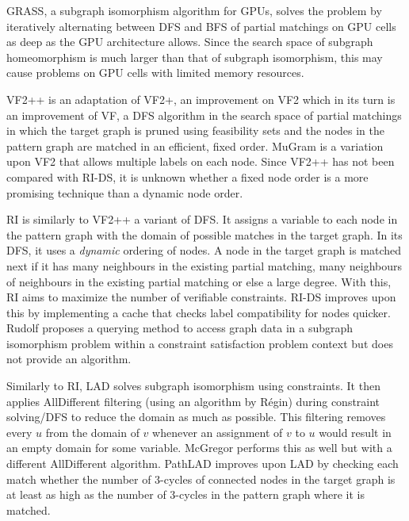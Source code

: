 GRASS\cite{Bonnici2019}, a subgraph isomorphism algorithm for GPUs, solves the problem by iteratively alternating between DFS and BFS of partial matchings on GPU cells as deep as the GPU architecture allows. Since the search space of subgraph homeomorphism is much larger than that of subgraph isomorphism, this may cause problems on GPU cells with limited memory resources.

VF2++\cite{Juttner2018a} is an adaptation of VF2+\cite{Carletti2015}, an improvement on VF2\cite{Cordella2004} which in its turn is an improvement of VF\cite{906251}, a DFS algorithm in the search space of partial matchings in which the target graph is pruned using feasibility sets and the nodes in the pattern graph are matched in an efficient, fixed order. MuGram\cite{mugram} is a variation upon VF2 that allows multiple labels on each node. Since VF2++ has not been compared with RI-DS\cite{Bonnici2017}, it is unknown whether a fixed node order is a more promising technique than a dynamic node order.

RI\cite{RIalgorithm} is similarly to VF2++ a variant of DFS. It assigns a variable to each node in the pattern graph with the domain of possible matches in the target graph. In its DFS, it uses a \textit{dynamic} ordering of nodes. A node in the target graph is matched next if it has many neighbours in the existing partial matching, many neighbours of neighbours in the existing partial matching or else a large degree. With this, RI aims to maximize the number of verifiable constraints. RI-DS\cite{Bonnici2017} improves upon this by implementing a cache that checks label compatibility for nodes quicker. Rudolf\cite{rudolf} proposes a querying method to access graph data in a subgraph isomorphism problem within a constraint satisfaction problem context but does not provide an algorithm.

Similarly to RI, LAD\cite{LAD} solves subgraph isomorphism using constraints.  It then applies AllDifferent filtering (using an algorithm by Régin\cite{Regin1994362}) during constraint solving/DFS to reduce the domain as much as possible. This filtering removes every $u$ from the domain of $v$ whenever an assignment of $v$ to $u$ would result in an empty domain for some variable. McGregor\cite{MCGREGOR1979229} performs this as well but with a different AllDifferent algorithm. PathLAD\cite{Kotthoff2016} improves upon LAD by checking each match whether the number of 3-cycles of connected nodes in the target graph is at least as high as the number of 3-cycles in the pattern graph where it is matched. 

